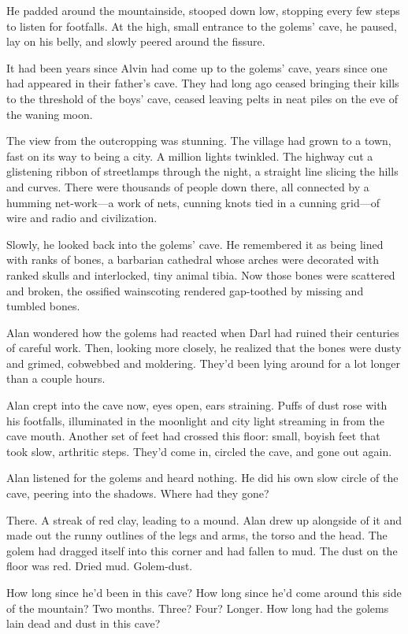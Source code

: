 \documentclass{article}
\begin{document}
He padded around the mountainside, stooped down low, stopping every
few steps to listen for footfalls.  At the high, small entrance to the
golems' cave, he paused, lay on his belly, and slowly peered around
the fissure.

It had been years since Alvin had come up to the golems' cave, years
since one had appeared in their father's cave.  They had long ago
ceased bringing their kills to the threshold of the boys' cave, ceased
leaving pelts in neat piles on the eve of the waning moon.

The view from the outcropping was stunning.  The village had grown to
a town, fast on its way to being a city.  A million lights twinkled. 
The highway cut a glistening ribbon of streetlamps through the night,
a straight line slicing the hills and curves.  There were thousands of
people down there, all connected by a humming net-work---a work of
nets, cunning knots tied in a cunning grid---of wire and radio and
civilization.

Slowly, he looked back into the golems' cave.  He remembered it as
being lined with ranks of bones, a barbarian cathedral whose arches
were decorated with ranked skulls and interlocked, tiny animal tibia. 
Now those bones were scattered and broken, the ossified wainscoting
rendered gap-toothed by missing and tumbled bones.

Alan wondered how the golems had reacted when Darl had ruined their
centuries of careful work.  Then, looking more closely, he realized
that the bones were dusty and grimed, cobwebbed and moldering.  They'd
been lying around for a lot longer than a couple hours.

Alan crept into the cave now, eyes open, ears straining.  Puffs of
dust rose with his footfalls, illuminated in the moonlight and city
light streaming in from the cave mouth.  Another set of feet had
crossed this floor:  small, boyish feet that took slow, arthritic
steps.  They'd come in, circled the cave, and gone out again.

Alan listened for the golems and heard nothing.  He did his own slow
circle of the cave, peering into the shadows.  Where had they gone?

There.  A streak of red clay, leading to a mound.  Alan drew up
alongside of it and made out the runny outlines of the legs and arms,
the torso and the head.  The golem had dragged itself into this corner
and had fallen to mud.  The dust on the floor was red.  Dried mud. 
Golem-dust.

How long since he'd been in this cave?  How long since he'd come
around this side of the mountain?  Two months.  Three?  Four?  Longer. 
How long had the golems lain dead and dust in this cave?
\end{document}

